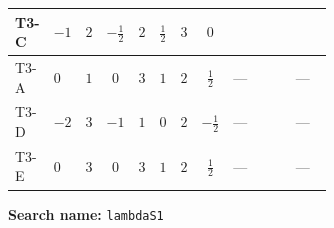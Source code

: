 \documentclass[8pt]{article}
\begin{document}
\begin{landscape}
\begin{longtable}{@{}llcccccc >{\raggedright\arraybackslash}p{0.21\linewidth} >{\raggedright\arraybackslash}p{0.21\linewidth} >{\raggedright\arraybackslash}p{0.21\linewidth}@{}}
\midrule
T3-C & $-1$ & $2$ & $-\frac{1}{2}$ & $2$ & $\frac{1}{2}$ & $3$ & $0$ & \scriptsize\adjustbox{max width=\linewidth}{$\begin{gathered} +\frac{3 {g_Y}^4}{4}\end{gathered}$} & \scriptsize\adjustbox{max width=\linewidth}{$\begin{gathered} +4 {\lambda_{12}}^2\end{gathered}$} & \scriptsize\adjustbox{max width=\linewidth}{$\begin{gathered} +\frac{{\lambda_{12}^{\rm Adj}}^2}{4}\end{gathered}$} \\
\midrule
T3-A & $0$ & $1$ & $0$ & $3$ & $1$ & $2$ & $\frac{1}{2}$ & --- & \scriptsize\adjustbox{max width=\linewidth}{$\begin{gathered} 6 {\lambda_{12}}^2\end{gathered}$} & --- \\
\midrule
T3-D & $-2$ & $3$ & $-1$ & $1$ & $0$ & $2$ & $-\frac{1}{2}$ & --- & \scriptsize\adjustbox{max width=\linewidth}{$\begin{gathered} +2 {\lambda_{12}}^2\end{gathered}$} & --- \\
\midrule
T3-E & $0$ & $3$ & $0$ & $3$ & $1$ & $2$ & $\frac{1}{2}$ & --- & \scriptsize\adjustbox{max width=\linewidth}{$\begin{gathered} +6 {\lambda_{12}}^2\end{gathered}$} & --- \\
\midrule
\bottomrule
\end{longtable}
\clearpage
\noindent\textbf{Search name: }\texttt{lambdaS1}\par\smallskip

\end{landscape}
\end{document}
